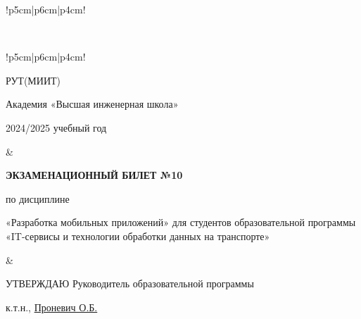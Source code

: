\documentclass[a4paper]{article}
\begin{document}
\begin{tabular}{!{\vrule width 2pt}p{5cm}|p{6cm}|p{4cm}!{\vrule width 2pt}}
{\begin{minipage}{16cm}
\vspace{0.2cm}
    
\end{minipage}
}
\\
\end{tabular}

\newpage


\begin{tabular}{!{\vrule width 2pt}p{5cm}|p{6cm}|p{4cm}!{\vrule width 2pt}}

    {\centering 
    \fontsize{14pt}{16pt}\selectfont
    РУТ(МИИТ)

\vspace{14pt}

Академия «Высшая инженерная школа»

\vspace{14pt}

2024/2025 учебный год

    }
&
{
    \centering
\fontsize{14pt}{16pt}\selectfont

\textbf{ЭКЗАМЕНАЦИОННЫЙ
БИЛЕТ №10}


по дисциплине 

«Разработка мобильных приложений» 
\fontsize{12pt}{14pt}\selectfont
для студентов образовательной программы «IT-сервисы и технологии обработки данных на транспорте»

}
&
{
\centering
\fontsize{14pt}{16pt}\selectfont

УТВЕРЖДАЮ
Руководитель образовательной программы

\vspace{1cm}

\fontsize{12pt}{14pt}\selectfont
\underline{\hspace{3cm}}

к.т.н., \underline{Проневич О.Б.}

}
\\
\hline
{}
\end{tabular}
\end{document}
